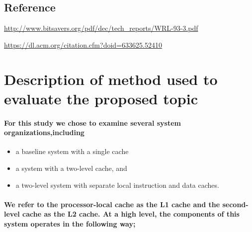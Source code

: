 \documentclass{article}
\begin{document}
\subsection{Reference}
\href{http://www.bitsavers.org/pdf/dec/tech_reports/WRL-93-3.pdf}{http://www.bitsavers.org/pdf/dec/tech_reports/WRL-93-3.pdf}

\href{https://dl.acm.org/citation.cfm?doid=633625.52410}{https://dl.acm.org/citation.cfm?doid=633625.52410}



\section{Description of method used to evaluate the proposed topic}
\paragraph{For this study we chose to examine several system organizations,including
}
\begin{itemize}
    \item a baseline system with a single cache
    \item a system with a two-level cache, and
    \item a two-level system with separate local instruction and data caches. 

\end{itemize}
\paragraph{We refer to the processor-local cache as the L1 cache and the second-level
 cache as the L2 cache. At a high level, the components of this system operates in
  the following way; }
\end{document}
